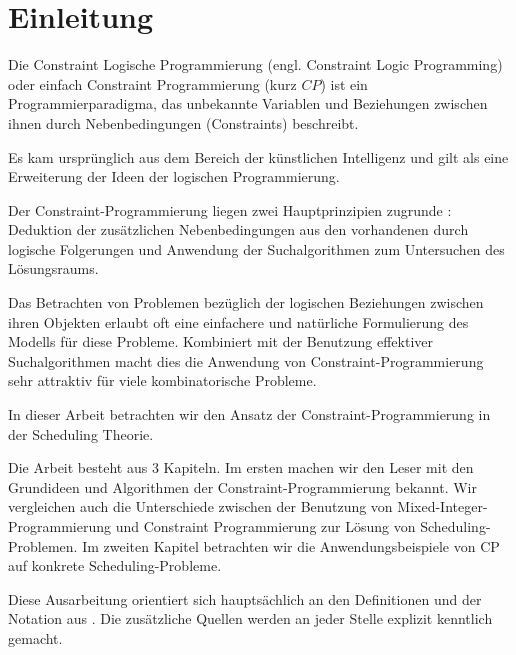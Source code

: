 \chapter*{ Einleitung}
\label{sec:Einletung}

\FloatBarrier 
Die Constraint Logische Programmierung (engl. Constraint Logic Programming) oder einfach Constraint Programmierung (kurz $CP$) ist ein Programmierparadigma, das unbekannte Variablen und Beziehungen zwischen ihnen durch Nebenbedingungen (Constraints) beschreibt. 

Es kam ursprünglich aus dem Bereich der künstlichen Intelligenz und gilt als eine Erweiterung der Ideen der logischen Programmierung.

Der Constraint-Programmierung liegen zwei Hauptprinzipien zugrunde \citep[vgl][]{CBScheduling} : Deduktion der zusätzlichen Nebenbedingungen aus den vorhandenen durch logische Folgerungen und Anwendung der Suchalgorithmen zum Untersuchen des Lösungsraums. 

Das Betrachten von Problemen bezüglich der logischen Beziehungen zwischen ihren Objekten erlaubt oft eine einfachere und natürliche Formulierung des Modells für diese Probleme. Kombiniert mit der Benutzung effektiver Suchalgorithmen macht dies die Anwendung von Constraint-Programmierung sehr attraktiv für viele kombinatorische Probleme.

In dieser Arbeit betrachten wir den Ansatz der Constraint-Programmierung in der Scheduling Theorie.

Die Arbeit besteht aus $3$ Kapiteln. Im ersten machen wir den Leser mit den Grundideen und Algorithmen der Constraint-Programmierung bekannt. Wir vergleichen auch die Unterschiede zwischen der Benutzung von Mixed-Integer-Programmierung und Constraint Programmierung zur Lösung von Scheduling-Problemen. Im zweiten Kapitel betrachten wir die Anwendungsbeispiele von CP auf konkrete Scheduling-Probleme.

Diese Ausarbeitung orientiert sich hauptsächlich an den Definitionen und der
Notation aus \cite{CPforScheduling}. Die zusätzliche Quellen werden an jeder Stelle explizit kenntlich gemacht.


